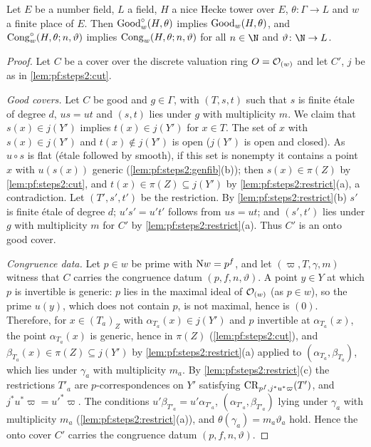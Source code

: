 \begin{theorem}[Cutting]\label{thm:pf:steps2:cut}
Let $E$ be a number field, $L$ a field, $H$ a nice Hecke tower over $E$, $\theta\colon\Gamma\to L$ and
$w$ a finite place of $E$. Then $\mathrm{Good}^\circ_w(H,\theta)$ implies $\mathrm{Good}_w(H,\theta)$,
and $\mathrm{Cong}^\circ_w(H,\theta;n,\vartheta)$ implies $\mathrm{Cong}_w(H,\theta;n,\vartheta)$ for all
$n\in\N$ and $\vartheta\colon\N\to L$.
\end{theorem}

\begin{proof}
Let $C$ be a cover over the discrete valuation ring $O=\mathcal{O}_{(w)}$ and let $C'$, $j$ be as in
\cref{lem:pf:steps2:cut}.

\emph{Good covers.} Let $C$ be good and $g\in\Gamma$, with $(T,s,t)$ such that $s$ is finite \'etale
of degree $d$, $us=ut$ and $(s,t)$ lies under $g$ with multiplicity $m$. We claim that
$s(x)\in j(Y')$ implies $t(x)\in j(Y')$ for $x\in T$. The set of $x$ with $s(x)\in j(Y')$ and
$t(x)\notin j(Y')$ is open ($j(Y')$ is open and closed). As $u\circ s$ is flat (\'etale followed by
smooth), if this set is nonempty it contains a point $x$ with $u(s(x))$ generic
(\cref{lem:pf:steps2:genfib}(b)); then $s(x)\in\pi(Z)$ by \cref{lem:pf:steps2:cut}, and
$t(x)\in\pi(Z)\subseteq j(Y')$ by \cref{lem:pf:steps2:restrict}(a), a contradiction. Let
$(T',s',t')$ be the restriction. By \cref{lem:pf:steps2:restrict}(b) $s'$ is finite \'etale of degree
$d$; $u's'=u't'$ follows from $us=ut$; and $(s',t')$ lies under $g$ with multiplicity $m$ for $C'$ by
\cref{lem:pf:steps2:restrict}(a). Thus $C'$ is an onto good cover.

\emph{Congruence data.} Let $p\in w$ be prime with $\mathrm{N}w=p^f$, and let
$(\varpi,T,\gamma,m)$ witness that $C$ carries the congruence datum $(p,f,n,\vartheta)$. A point
$y\in Y$ at which $p$ is invertible is generic: $p$ lies in the maximal ideal of $\mathcal{O}_{(w)}$ (as
$p\in w$), so the prime $u(y)$, which does not contain $p$, is not maximal, hence is $(0)$.
Therefore, for $x\in(T_a)_Z$ with $\alpha_{T_a}(x)\in j(Y')$ and $p$ invertible at $\alpha_{T_a}(x)$,
the point $\alpha_{T_a}(x)$ is generic, hence in $\pi(Z)$ (\cref{lem:pf:steps2:cut}), and
$\beta_{T_a}(x)\in\pi(Z)\subseteq j(Y')$ by \cref{lem:pf:steps2:restrict}(a) applied to
$(\alpha_{T_a},\beta_{T_a})$, which lies under $\gamma_a$ with multiplicity $m_a$. By
\cref{lem:pf:steps2:restrict}(c) the restrictions $T'_a$ are $p$-correspondences on $Y'$ satisfying
$\mathrm{CR}_{p^f,j^\ast u^\ast\varpi}(T')$, and $j^\ast u^\ast\varpi=u'^\ast\varpi$. The conditions
$u'\beta_{T'_a}=u'\alpha_{T'_a}$, $(\alpha_{T'_a},\beta_{T'_a})$ lying under $\gamma_a$ with
multiplicity $m_a$ (\cref{lem:pf:steps2:restrict}(a)), and $\theta(\gamma_a)=m_a\vartheta_a$ hold.
Hence the onto cover $C'$ carries the congruence datum $(p,f,n,\vartheta)$.
\end{proof}



